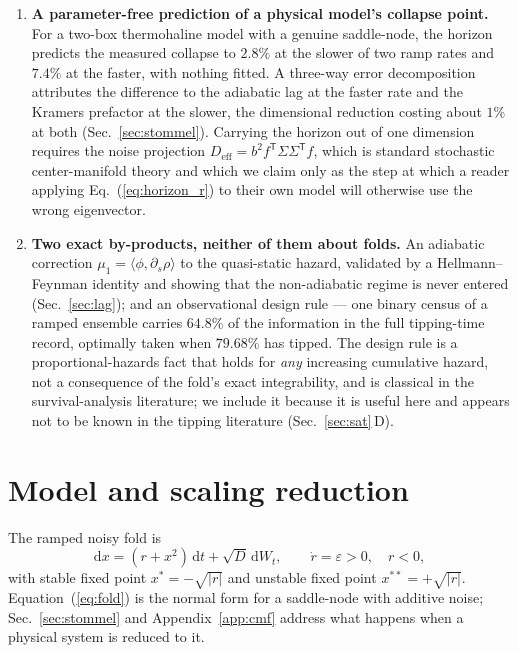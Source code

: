 \documentclass[%
 twocolumn,
 superscriptaddress,
 amsmath,amssymb,
 aps,
 pre,
 floatfix,
]{revtex4-2}
\newcommand{\dd}{\mathrm{d}}
\begin{document}
\begin{enumerate}
\item \textbf{A parameter-free prediction of a physical model's collapse point.}  For a two-box thermohaline model with a genuine saddle-node, the horizon predicts the measured collapse to $2.8\%$ at the slower of two ramp rates and $7.4\%$ at the faster, with nothing fitted.  A three-way error decomposition attributes the difference to the adiabatic lag at the faster rate and the Kramers prefactor at the slower, the dimensional reduction costing about $1\%$ at both (Sec.~\ref{sec:stommel}).  Carrying the horizon out of one dimension requires the noise projection $D_{\mathrm{eff}}=b^2f^{\mathsf T}\Sigma\Sigma^{\mathsf T}f$, which is standard stochastic center-manifold theory and which we claim only as the step at which a reader applying Eq.~(\ref{eq:horizon_r}) to their own model will otherwise use the wrong eigenvector.

\item \textbf{Two exact by-products, neither of them about folds.}  An adiabatic correction $\mu_1=\langle\phi,\partial_s\rho\rangle$ to the quasi-static hazard, validated by a Hellmann--Feynman identity and showing that the non-adiabatic regime is never entered (Sec.~\ref{sec:lag}); and an observational design rule --- one binary census of a ramped ensemble carries $64.8\%$ of the information in the full tipping-time record, optimally taken when $79.68\%$ has tipped.  The design rule is a proportional-hazards fact that holds for \emph{any} increasing cumulative hazard, not a consequence of the fold's exact integrability, and is classical in the survival-analysis literature; we include it because it is useful here and appears not to be known in the tipping literature (Sec.~\ref{sec:sat}\,D).

\end{enumerate}

\section{\label{sec:model}Model and scaling reduction}

The ramped noisy fold is
\begin{equation}
\label{eq:fold}
\dd x=(r+x^2)\,\dd t+\sqrt D\,\dd W_t,\qquad \dot r=\varepsilon>0,\quad r<0,
\end{equation}
with stable fixed point $x^\ast=-\sqrt{|r|}$ and unstable fixed point $x^{\ast\ast}=+\sqrt{|r|}$.  Equation~(\ref{eq:fold}) is the normal form for a saddle-node with additive noise; Sec.~\ref{sec:stommel} and Appendix~\ref{app:cmf} address what happens when a physical system is reduced to it.
\end{document}

